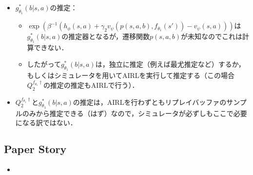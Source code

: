 \documentclass[a4paper,10pt,dvipdfmx]{jsarticle}
\begin{document}
\begin{itemize}
\begin{itemize}
        \begin{multline}
            h_{\phi}(s,a)+\gamma_2v_{\psi}(s',f_{\theta_1}(s'))-v_{\psi}(s,a)\approx r_2(s,a)+\gamma_2V_2^{f_{\theta_1}\dag}(s',f_{\theta_1}(s'))-V_2^{f_{\theta_1}\dag}(s,a)\\\forall s,a\in\mathcal{S}\x\mathcal{A}
        \end{multline}
        のように推定できれば，のもとで
        \begin{align}
            h_{\phi}(s,a)\approx r_2(s,a),\quad v_{\psi}(s,a)\approx V_2^{f_{\theta_1}\dag}(s,a)\quad\forall s,a\in\mathcal{S}\x\mathcal{A}
        \end{align}
        が成り立つ\cite{Fu2018-lp}．この推定ができると，$\nabla_{\theta_1}Q_2^{f_{\theta_1}\dag}(s,f_{\theta_1}(s),b)$は
        \begin{align}
            \nabla_{\theta_1}\left(h_{\phi}(s,f_{\theta_1}(s))+\gamma_2v_{\psi}(s',f_{\theta_1}(s'))\right)\approx\nabla_{\theta_1}Q_2^{f_{\theta_1}\dag}(s,f_{\theta_1}(s),b)
        \end{align}
        のように推定できる．
    \end{itemize}
    \item $g_{\theta_1}^*(b|s,a)$の推定：
    \begin{itemize}
        \item $\exp\left(\beta^{-1}(h_{\phi}(s,a)+\gamma_2v_{\psi}(p(s,a,b),f_{\theta_1}(s'))-v_{\psi}(s,a))\right)$は$g_{\theta_1}^*(b|s,a)$の推定器となるが，遷移関数$p(s,a,b)$が未知なのでこれは計算できない．
        \item したがって$g_{\theta_1}^*(b|s,a)$は，独立に推定（例えば最尤推定など）するか，もしくはシミュレータを用いてAIRL\cite{Fu2018-lp}を実行して推定する（この場合$Q_2^{f_{\theta_1}\dag}$の推定の推定もAIRLで行う）．
    \end{itemize}
    \item $Q_2^{f_{\theta_1}\dag}$と$g_{\theta_1}^*(b|s,a)$の推定は，AIRLを行わずともリプレイバッファのサンプルのみから推定できる（はず）なので，シミュレータが必ずしもここで必要になる訳ではない．
\end{itemize}


\subsection{Paper Story}

\begin{itemize}
    \item 
\end{itemize}
\end{document}
